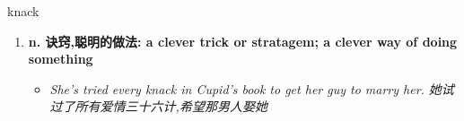 
\begin{frame}
{\huge knack}
\begin{center}
\begin{enumerate}\Large
  \item \textbf{n. 诀窍,聪明的做法: a clever trick or stratagem; a clever way of doing something}
  \begin{itemize}
    \item \em{\Large{She's tried every knack in Cupid's book to get her guy to marry her. 她试过了所有爱情三十六计,希望那男人娶她}}
  \end{itemize}
\end{enumerate}
\end{center}
\end{frame}
